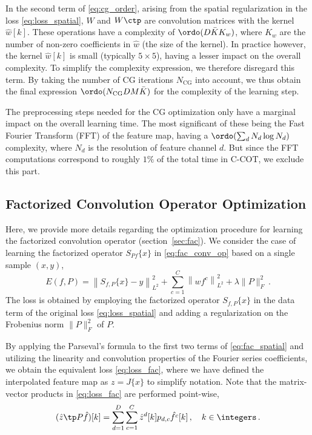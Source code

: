 \documentclass[10pt,twocolumn,letterpaper]{article}
\begin{document}
In the second term of \eqref{eq:cg_order}, arising from the spatial regularization in the loss \eqref{eq:loss_spatial}, $W$ and $W\ctp$ are convolution matrices with the kernel $\hat{w}[k]$. These operations have a complexity of $\ordo(D \bar{K} K_w)$, where $K_w$ are the number of non-zero coefficients in $\hat{w}$ (\ie the size of the kernel). In practice however, the kernel $\hat{w}[k]$ is small (typically $5 \times 5$), having a lesser impact on the overall complexity. To simplify the complexity expression, we therefore disregard this term. By taking the number of CG iterations $N_\text{CG}$ into account, we thus obtain the final expression  $\ordo(N_\text{CG} D M \bar{K})$ for the complexity of the learning step.

The preprocessing steps needed for the CG optimization only have a marginal impact on the overall learning time. The most significant of these being the Fast Fourier Transform (FFT) of the feature map, having a $\ordo( \sum_d N_d \log N_d)$ complexity, where $N_d$ is the resolution of feature channel $d$. But since the FFT computations correspond to roughly $1 \%$ of the total time in C-COT, we exclude this part.

\subsection*{Factorized Convolution Operator Optimization}
\label{sec:supp_optimization}

Here, we provide more details regarding the optimization procedure for learning the factorized convolution operator (section~\ref{sec:fac}). We consider the case of learning the factorized operator $S_{Pf}\{x\}$ in \eqref{eq:fac_conv_op} based on a single sample $(x,y)$,
\begin{equation}
\label{eq:fac_spatial}
E(f,P) = \left\| S_{f,P}\{x\} - y \right\|^2_{L^2} + \sum_{c=1}^{C} \left\| w f^c \right\|^2_{L^2} + \lambda \|P\|_F^2 \,.
\end{equation}
The loss is obtained by employing the factorized operator $S_{f,P}\{x\}$ in the data term of the original loss \eqref{eq:loss_spatial} and adding a regularization on the Frobenius norm $\|P\|_F^2$ of $P$.

By applying the Parseval's formula to the first two terms of \eqref{eq:fac_spatial} and utilizing the linearity and convolution properties of the Fourier series coefficients, we obtain the equivalent loss \eqref{eq:loss_fac}, where we have defined the interpolated feature map as $z = J\{x\}$ to simplify notation. Note that the matrix-vector products in \eqref{eq:loss_fac} are performed point-wise,
\begin{equation}
	\label{eq:prod}
	(\hat{z}\tp P \hat{f})[k] = \sum_{d=1}^{D} \sum_{c=1}^{C} \hat{z}^d[k] p_{d,c} \hat{f^c}[k] \,, \quad k \in \integers  \,.
\end{equation}
\end{document}
